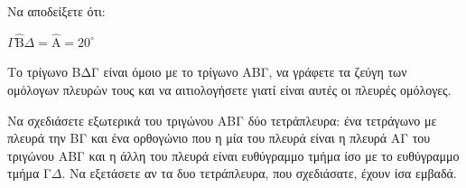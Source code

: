 \begin{alist}
    \item Να αποδείξετε ότι:
    \begin{rlist}
        \item $\Gamma\hat{\text{B}}\Delta = \hat{\text{A}} = 20^\circ$ 
        \item Το τρίγωνο ΒΔΓ είναι όμοιο με το τρίγωνο ΑΒΓ, να γράφετε τα ζεύγη των ομόλογων πλευρών τους και να αιτιολογήσετε γιατί είναι αυτές οι πλευρές ομόλογες. 
    \end{rlist}
    \item Να σχεδιάσετε εξωτερικά του τριγώνου ΑΒΓ δύο τετράπλευρα: ένα τετράγωνο με πλευρά την ΒΓ και ένα ορθογώνιο που η μία του πλευρά είναι η πλευρά ΑΓ του τριγώνου ΑΒΓ και η άλλη του πλευρά είναι ευθύγραμμο τμήμα ίσο με το ευθύγραμμο τμήμα Γ$\Delta$. Να εξετάσετε αν τα δυο τετράπλευρα, που σχεδιάσατε, έχουν ίσα εμβαδά. 
\end{alist}